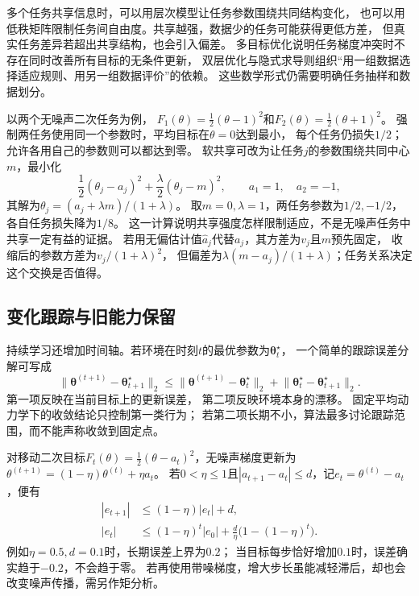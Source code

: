 多个任务共享信息时，可以用层次模型让任务参数围绕共同结构变化，
也可以用低秩矩阵限制任务间自由度。共享越强，数据少的任务可能获得更低方差，
但真实任务差异若超出共享结构，也会引入偏差。
多目标优化说明任务梯度冲突时不存在同时改善所有目标的无条件更新，
双层优化与隐式求导则组织“用一组数据选择适应规则、用另一组数据评价”的依赖。
这些数学形式仍需要明确任务抽样和数据划分。

以两个无噪声二次任务为例，
$F_1(\theta)=\tfrac12(\theta-1)^2$和$F_2(\theta)=\tfrac12(\theta+1)^2$。
强制两任务使用同一个参数时，平均目标在$\theta=0$达到最小，
每个任务仍损失$1/2$；允许各用自己的参数则可以都达到零。
软共享可改为让任务$j$的参数围绕共同中心$m$，最小化
\[
  \frac12(\theta_j-a_j)^2+\frac{\lambda}{2}(\theta_j-m)^2,
  \qquad a_1=1,\quad a_2=-1,
\]
其解为$\theta_j=(a_j+\lambda m)/(1+\lambda)$。
取$m=0,\lambda=1$，两任务参数为$1/2,-1/2$，各自任务损失降为$1/8$。
这一计算说明共享强度怎样限制适应，不是无噪声任务中共享一定有益的证据。
若用无偏估计值$\widehat a_j$代替$a_j$，其方差为$v_j$且$m$预先固定，
收缩后的参数方差为$v_j/(1+\lambda)^2$，
但偏差为$\lambda(m-a_j)/(1+\lambda)$；任务关系决定这个交换是否值得。

\subsection{变化跟踪与旧能力保留}
\label{sec:future-fixed-task-tracking-retention}

持续学习还增加时间轴。若环境在时刻$t$的最优参数为$\bm\theta_t^\star$，
一个简单的跟踪误差分解可写成
\[
  \lVert
    \bm\theta^{(t+1)}-\bm\theta_{t+1}^\star
  \rVert_2
  \leq
  \lVert
    \bm\theta^{(t+1)}-\bm\theta_t^\star
  \rVert_2
  +
  \lVert
    \bm\theta_t^\star-\bm\theta_{t+1}^\star
  \rVert_2.
\]
第一项反映在当前目标上的更新误差，
第二项反映环境本身的漂移。
固定平均动力学下的收敛结论只控制第一类行为；
若第二项长期不小，算法最多讨论跟踪范围，而不能声称收敛到固定点。

对移动二次目标$F_t(\theta)=\tfrac12(\theta-a_t)^2$，无噪声梯度更新为
$\theta^{(t+1)}=(1-\eta)\theta^{(t)}+\eta a_t$。
若$0<\eta\leq1$且$|a_{t+1}-a_t|\leq d$，记$e_t=\theta^{(t)}-a_t$，便有
\begin{align*}
  |e_{t+1}|&\leq(1-\eta)|e_t|+d,\\
  |e_t|&\leq(1-\eta)^t|e_0|+\frac d\eta\bigl(1-(1-\eta)^t\bigr).
\end{align*}
例如$\eta=0.5,d=0.1$时，长期误差上界为$0.2$；
当目标每步恰好增加$0.1$时，误差确实趋于$-0.2$，不会趋于零。
若再使用带噪梯度，增大步长虽能减轻滞后，却也会改变噪声传播，需另作矩分析。

